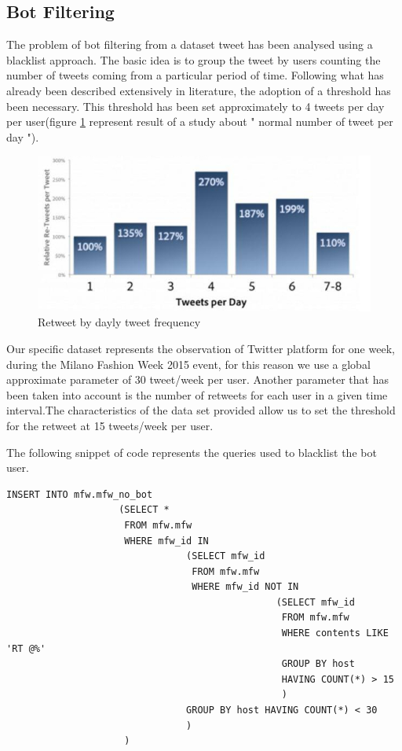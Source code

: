 \documentclass[conference, onecolumn]{IEEEtran}
\begin{document}
\subsection{Bot Filtering}
\medskip
The problem of bot filtering from a dataset tweet has been analysed using a blacklist approach. The basic idea is to group the tweet by users counting the number of tweets coming from a particular period of time. Following what has already been described extensively in literature, the adoption of a threshold has been necessary. This threshold has been set approximately to 4 tweets per day per user(figure \ref{fig:tweeDay} represent result of a study about " normal number of tweet per day ").
\begin{figure} [!htbp]
	\centering
	\vspace{0.3cm}
	\includegraphics[scale=0.6]{images/daytweet}
	\caption{Retweet by dayly tweet frequency}
	\vspace{0.3cm}
	\label{fig:tweeDay}
\end{figure}
Our specific dataset represents the observation of Twitter platform for one week, during the Milano Fashion Week 2015 event, for this reason we use a global approximate parameter of 30 tweet/week per user. Another parameter that has been taken into account is the number of retweets for each user in a given time interval.The characteristics of the data set provided allow us to set the threshold for the retweet at 15 tweets/week per user.

The following snippet of code represents the queries used to blacklist the bot user.
\begin{lstlisting}
INSERT INTO mfw.mfw_no_bot
					(SELECT * 
					 FROM mfw.mfw 
					 WHERE mfw_id IN
								(SELECT mfw_id
								 FROM mfw.mfw
								 WHERE mfw_id NOT IN
												(SELECT mfw_id
												 FROM mfw.mfw
												 WHERE contents LIKE 'RT @%'
												 GROUP BY host
												 HAVING COUNT(*) > 15
												 )
								GROUP BY host HAVING COUNT(*) < 30
								)
					 )
\end{lstlisting}
\end{document}
